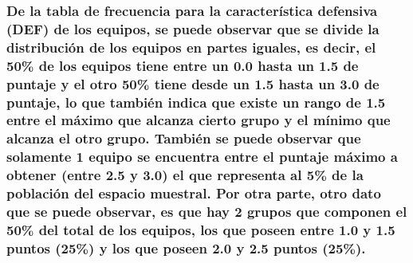 \documentclass[]{article}
\begin{document}
\hypertarget{de-la-tabla-de-frecuencia-para-la-caracteristica-defensiva-def-de-los-equipos-se-puede-observar-que-se-divide-la-distribucion-de-los-equipos-en-partes-iguales-es-decir-el-50-de-los-equipos-tiene-entre-un-0.0-hasta-un-1.5-de-puntaje-y-el-otro-50-tiene-desde-un-1.5-hasta-un-3.0-de-puntaje-lo-que-tambien-indica-que-existe-un-rango-de-1.5-entre-el-maximo-que-alcanza-cierto-grupo-y-el-minimo-que-alcanza-el-otro-grupo.-tambien-se-puede-observar-que-solamente-1-equipo-se-encuentra-entre-el-puntaje-maximo-a-obtener-entre-2.5-y-3.0-el-que-representa-al-5-de-la-poblacion-del-espacio-muestral.-por-otra-parte-otro-dato-que-se-puede-observar-es-que-hay-2-grupos-que-componen-el-50-del-total-de-los-equipos-los-que-poseen-entre-1.0-y-1.5-puntos-25-y-los-que-poseen-2.0-y-2.5-puntos-25.}{%
\subsubsection{De la tabla de frecuencia para la característica
defensiva (DEF) de los equipos, se puede observar que se divide la
distribución de los equipos en partes iguales, es decir, el 50\% de los
equipos tiene entre un 0.0 hasta un 1.5 de puntaje y el otro 50\% tiene
desde un 1.5 hasta un 3.0 de puntaje, lo que también indica que existe
un rango de 1.5 entre el máximo que alcanza cierto grupo y el mínimo que
alcanza el otro grupo. También se puede observar que solamente 1 equipo
se encuentra entre el puntaje máximo a obtener (entre 2.5 y 3.0) el que
representa al 5\% de la población del espacio muestral. Por otra parte,
otro dato que se puede observar, es que hay 2 grupos que componen el
50\% del total de los equipos, los que poseen entre 1.0 y 1.5 puntos
(25\%) y los que poseen 2.0 y 2.5 puntos
(25\%).}\label{de-la-tabla-de-frecuencia-para-la-caracteristica-defensiva-def-de-los-equipos-se-puede-observar-que-se-divide-la-distribucion-de-los-equipos-en-partes-iguales-es-decir-el-50-de-los-equipos-tiene-entre-un-0.0-hasta-un-1.5-de-puntaje-y-el-otro-50-tiene-desde-un-1.5-hasta-un-3.0-de-puntaje-lo-que-tambien-indica-que-existe-un-rango-de-1.5-entre-el-maximo-que-alcanza-cierto-grupo-y-el-minimo-que-alcanza-el-otro-grupo.-tambien-se-puede-observar-que-solamente-1-equipo-se-encuentra-entre-el-puntaje-maximo-a-obtener-entre-2.5-y-3.0-el-que-representa-al-5-de-la-poblacion-del-espacio-muestral.-por-otra-parte-otro-dato-que-se-puede-observar-es-que-hay-2-grupos-que-componen-el-50-del-total-de-los-equipos-los-que-poseen-entre-1.0-y-1.5-puntos-25-y-los-que-poseen-2.0-y-2.5-puntos-25.}}
\end{document}

